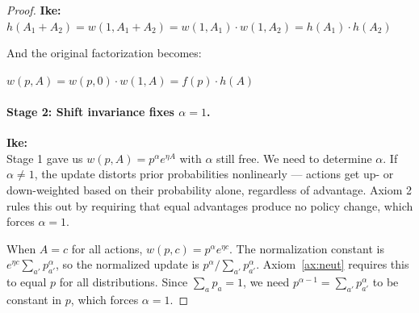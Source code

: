 \documentclass[11pt]{article}
\theoremstyle{definition}
\theoremstyle{remark}
\newenvironment{ike}{\color{blue}\textbf{Ike:}\\}{}
\begin{document}
\begin{proof}
\begin{ike}
$h(A_1 + A_2) = w(1, A_1 + A_2) = w(1, A_1) \cdot w(1, A_2) = h(A_1) \cdot h(A_2)$

And the original factorization becomes:

$w(p, A) = w(p, 0) \cdot w(1, A) = f(p) \cdot h(A)$
\end{ike}

\paragraph{Stage 2: Shift invariance fixes $\alpha = 1$.}

\begin{ike}
Stage 1 gave us $w(p, A) = p^\alpha e^{\eta A}$ with $\alpha$ still free. We need to determine $\alpha$. If $\alpha \neq 1$, the update distorts prior probabilities nonlinearly --- actions get up- or down-weighted based on their probability alone, regardless of advantage. Axiom 2 rules this out by requiring that equal advantages produce no policy change, which forces $\alpha = 1$.
\end{ike}

When $A = c$ for all actions, $w(p, c) = p^\alpha e^{\eta c}$. The normalization constant is $e^{\eta c}\sum_{a'} p_{a'}^\alpha$, so the normalized update is $p^\alpha / \sum_{a'} p_{a'}^\alpha$. Axiom~\ref{ax:neut} requires this to equal $p$ for all distributions. Since $\sum_a p_a = 1$, we need $p^{\alpha - 1} = \sum_{a'} p_{a'}^\alpha$ to be constant in $p$, which forces $\alpha = 1$.
\end{proof}
\end{document}
